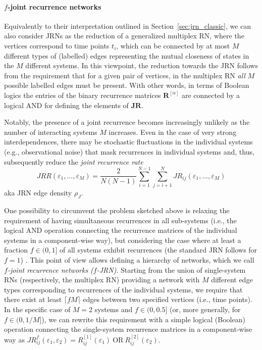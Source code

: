 		\paragraph{$f$-joint recurrence networks}
		Equivalently to their interpretation outlined in Section~\ref{sec:jrn_classic}, we can also consider JRNs as the reduction of a generalized multiplex RN, where the vertices correspond to time points $t_i$, which can be connected by at most $M$ different types of (labelled) edges representing the mutual closeness of states in the $M$ different systems. In this viewpoint, the reduction towards the JRN follows from the requirement that for a given pair of vertices, in the multiplex RN \emph{all} $M$ possible labelled edges must be present. With other words, in terms of Boolean logics the entries of the binary recurrence matrices $\mathbf{R}^{[\alpha]}$ are connected by a logical AND for defining the elements of $\mathbf{JR}$.

		Notably, the presence of a joint recurrence becomes increasingly unlikely as the number of interacting systems $M$ increases. Even in the case of very strong interdependences, there may be stochastic fluctuations in the individual systems (e.g., observational noise) that mask recurrences in individual systems and, thus, subsequently reduce the \emph{joint recurrence rate}
\begin{equation}
JRR(\varepsilon_1,\dots,\varepsilon_M) = \frac{2}{N(N-1)} \sum_{i=1}^{N-1} \sum_{j=i+1}^N JR_{ij} (\varepsilon_1,\dots,\varepsilon_M)
\end{equation}
\noindent
aka JRN edge density $\rho_J$.

		One possibility to circumvent the problem sketched above is relaxing the requirement of having simultaneous recurrences in all sub-systems (i.e., the logical AND operation connecting the recurrence matrices of the individual systems in a component-wise way), but considering the case where at least a fraction $f \in(0,1]$ of all systems exhibit recurrences (the standard JRN follows for $f = 1$) \cite{Donner2015RPBook}. This point of view allows defining a hierarchy of networks, which we call \textit{$f$-joint recurrence networks ($f$-JRN)}. Starting from the union of single-system RNs (respectively, the multiplex RN) providing a network with $M$ different edge types corresponding to recurrences of the individual systems, we require that there exist at least $\lceil f M\rceil$ edges between two specified vertices (i.e., time points). In the specific case of $M=2$ systems and $f \in (0,0.5]$ (or, more generally, for $f \in(0,1/M]$), we can rewrite this requirement with a simple logical (Boolean) operation connecting the single-system recurrence matrices in a component-wise way as $JR^{f}_{ij}(\varepsilon_1,\varepsilon_2) = R^{[1]}_{ij}(\varepsilon_1)\ \mbox{OR}\ R^{[2]}_{ij}(\varepsilon_2)$.

